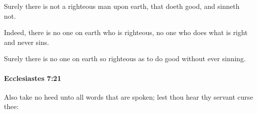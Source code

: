 			\begin{versebox}
					\item[BHS] 
					\item[LXX] 
					\item[ASV] Surely there is not a righteous man upon earth, that doeth good, and sinneth not.
					\item[NIV] Indeed, there is no one on earth who is righteous, no one who does what is right and never sins.
					\item[NRSV] Surely there is no one on earth so righteous as to do good without ever sinning.
			\end{versebox}

		\paragraph{Ecclesiastes 7:21} %
			\label{ECCLESIASTES-7-21}

			Also take no heed unto all words that are spoken; lest thou hear thy servant curse thee:

